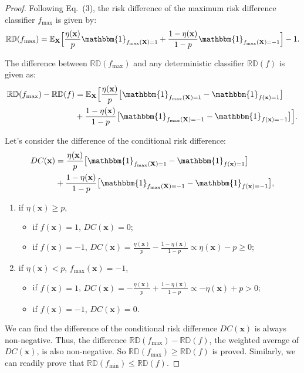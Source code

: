 \documentclass[letterpaper]{article} %
\newcommand{\X}{\mathbf{X}}
\newcommand{\x}{\mathbf{x}}
\newcommand{\E}{\mathbb{E}}
\newcommand{\I}{\mathbbm{1}}
\newcommand{\RD}{\mathbb{RD}}
\begin{document}
\begin{proof}
	Following Eq.~(3), the risk difference of the maximum risk difference classifier $f_{\max}$ is given by:
	\begin{eqnarray*}
		\RD(f_{\max}) = \E_{\X} \Big[ \frac{\eta(\x)}{p} \I_{f_{\max}(\X)=1} + \frac{1-\eta(\x)}{1-p} \I_{f_{\max}(\X)=-1} \Big] -1.
	\end{eqnarray*}

	The difference between $\RD ( f_{\max} ) $ and any deterministic classifier $ \RD ( f )$ is given as:
	\begin{align*}
		\RD ( f_{\max} ) - \RD ( f ) & =  \E_{\X} \Big[ \frac{\eta(\x)}{p} \big[\I_{f_{\max}(\X)=1} - \I_{f(\x)=1}\big] \\
		                             & + \frac{1-\eta(\x)}{1-p} \big[\I_{f_{\max}(\X)=-1} - \I_{f(\x)=-1}\big] \Big].
	\end{align*}

	Let's consider the difference of the conditional risk difference:
	\begin{align*}
		DC(\x) & = \frac{\eta(\x)}{p} \big[\I_{f_{\max}(\X)=1} - \I_{f(\x)=1}\big]        \\
		       & + \frac{1-\eta(\x)}{1-p} \big[\I_{f_{\max}(\X)=-1} - \I_{f(\x)=-1}\big],
	\end{align*}
\begin{enumerate}
		\item if $ \eta(\x) \geq p $,  %
		\begin{itemize}
			\item if $f(\x) = 1$, %
					$DC(\x)=0$;
			\item if $f(\x) = -1$, %
					$DC(\x)= \frac{\eta(\x)}{p} - \frac{1-\eta(\x)}{1-p} \propto \eta(\x) - p \geq 0 $;
		\end{itemize}
		\item if $ \eta(\x) < p $,  $ f_{\max}(\x) = -1 $, %
		\begin{itemize}
			\item if $f(\x) = 1$, %
					$DC(\x)= -\frac{\eta(\x)}{p} + \frac{1-\eta(\x)}{1-p} \propto -\eta(\x) + p > 0 $;
			\item if $f(\x) = -1$,  %
			 		$DC(\x)=0$.
		\end{itemize}
	\end{enumerate}

	We can find the difference of the conditional risk difference $DC(\x)$ is always non-negative. Thus, the difference $\RD ( f_{\max} ) - \RD ( f )$, the weighted average of $DC(\x)$, is also non-negative. So $\RD ( f_{\max} ) \geq \RD ( f ) $ is proved. Similarly, we can readily prove that $ \RD (f_{\min}) \leq \RD ( f ) $.
\end{proof}
\end{document}
